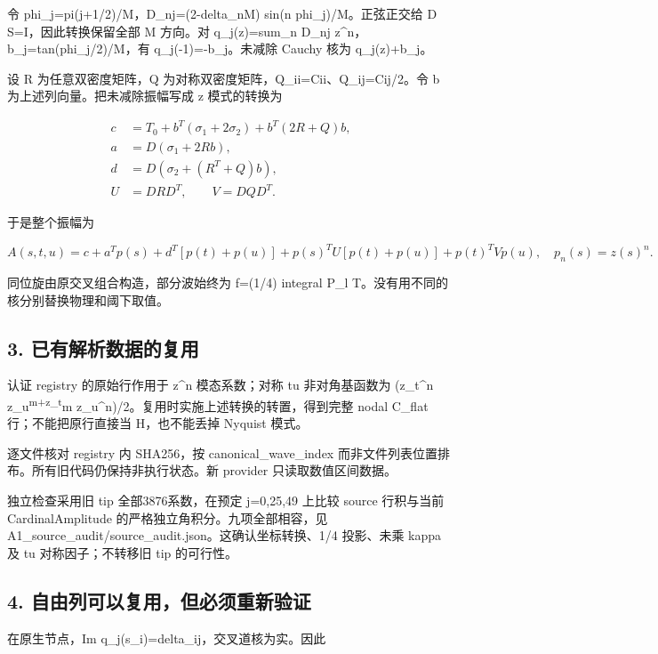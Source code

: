 \documentclass[
  10pt,
  a4paper,
]{article}
\begin{document}
令 phi\_j=pi(j+1/2)/M，D\_nj=(2-delta\_nM) sin(n phi\_j)/M。正弦正交给 D
S=I，因此转换保留全部 M 方向。对 q\_j(z)=sum\_n D\_nj
z\^{}n，b\_j=tan(phi\_j/2)/M，有 q\_j(-1)=-b\_j。未减除 Cauchy 核为
q\_j(z)+b\_j。

设 R 为任意双密度矩阵，Q 为对称双密度矩阵，Q\_ii=Cii、Q\_ij=Cij/2。令 b
为上述列向量。把未减除振幅写成 z 模式的转换为

\[
\begin{aligned}
c&=T_0+b^T(\sigma_1+2\sigma_2)+b^T(2R+Q)b,\\
a&=D(\sigma_1+2Rb),\\
d&=D(\sigma_2+(R^T+Q)b),\\
U&=DRD^T,\qquad V=DQD^T.
\end{aligned}
\]

于是整个振幅为

\[
A(s,t,u)=c+a^Tp(s)+d^T[p(t)+p(u)]
+p(s)^TU[p(t)+p(u)]+p(t)^TVp(u),
\quad p_n(s)=z(s)^n.
\]

同位旋由原交叉组合构造，部分波始终为 f=(1/4) integral P\_l
T。没有用不同的核分别替换物理和阈下取值。

\subsection{3.
已有解析数据的复用}\label{ux5df2ux6709ux89e3ux6790ux6570ux636eux7684ux590dux7528}

认证 registry 的原始行作用于 z\^{}n 模态系数；对称 tu 非对角基函数为
(z\_t\^{}n z\_u\textsuperscript{m+z\_t}m
z\_u\^{}n)/2。复用时实施上述转换的转置，得到完整 nodal C\_flat
行；不能把原行直接当 H，也不能丢掉 Nyquist 模式。

逐文件核对 registry 内 SHA256，按 canonical\_wave\_index
而非文件列表位置排布。所有旧代码仍保持非执行状态。新 provider
只读取数值区间数据。

独立检查采用旧 tip 全部3876系数，在预定 j=0,25,49 上比较 source
行积与当前 CardinalAmplitude 的严格独立角积分。九项全部相容，见
A1\_source\_audit/source\_audit.json。这确认坐标转换、1/4 投影、未乘
kappa 及 tu 对称因子；不转移旧 tip 的可行性。

\subsection{4.
自由列可以复用，但必须重新验证}\label{ux81eaux7531ux5217ux53efux4ee5ux590dux7528ux4f46ux5fc5ux987bux91cdux65b0ux9a8cux8bc1}

在原生节点，Im q\_j(s\_i)=delta\_ij，交叉道核为实。因此
\end{document}
